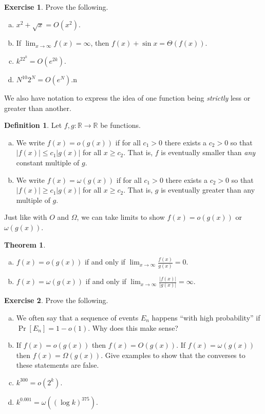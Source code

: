 \documentclass[11pt,letterpaper]{report}
\newcommand{\reals}{\mathbb{R}}
\theoremstyle{definition}
\newtheorem{definition}{Definition}
\newtheorem{exercise}{Exercise}
\newtheorem{theorem}{Theorem}
\begin{document}
\begin{exercise}
	Prove the following.
	\begin{enumerate}[(a)]
		\item $x^2 + \sqrt{x} = O(x^2)$.
		\item If $\lim_{x\to \infty}f(x) = \infty$, then $f(x) + \sin x = \Theta(f(x))$.
		\item $k^22^k = O(e^{2k})$.
		\item $N^{10}2^N = O(e^N)$.n
	\end{enumerate}
\end{exercise}

We also have notation to express the idea of one function being \textit{strictly} less or greater than another.

\begin{definition}
	Let $f,g:\reals\to \reals$ be functions.
	\begin{enumerate}[(a)]
		\item We write $f(x) = o(g(x))$ if for all $c_1>0$ there exists a $c_2>0$ so that $|f(x)|\leq c_1|g(x)|$ for all $x \geq c_2$. That is, $f$ is eventually smaller than \textit{any} constant multiple of $g$.
		\item We write $f(x)= \omega(g(x))$ if for all $c_1>0$ there exists a $c_2>0$ so that $|f(x)|\geq c_1|g(x)|$ for all $x\geq c_2$. That is, $g$ is eventually greater than any multiple of $g$.
	\end{enumerate}
\end{definition}

Just like with $O$ and $\Omega$, we can take limits to show $f(x) = o(g(x))$ or $\omega(g(x))$.

\begin{theorem}
	\begin{enumerate}[(a)]
		\item $f(x) = o(g(x))$ if and only if $\lim_{x\to \infty}\frac{f(x)}{g(x)} = 0$.
		\item $f(x) = \omega(g(x))$ if and only if $\lim_{x\to \infty}\frac{|f(x)|}{|g(x)|} = \infty$.
	\end{enumerate}
\end{theorem}

\begin{exercise}
	Prove the following.
	\begin{enumerate}[(a)]
		\item We often say that a sequence of events $E_n$ happens ``with high probability'' if $\Pr[E_n] = 1-o(1)$. Why does this make sense?
		\item If $f(x) = o(g(x))$ then $f(x) = O(g(x))$. If $f(x) = \omega(g(x))$ then $f(x) = \Omega(g(x))$. Give examples to show that the converses to these statements are false.
		\item $k^{300} = o(2^k)$.
		\item $k^{0.001} = \omega((\log k)^{375})$.
	\end{enumerate}
\end{exercise}
\end{document}

